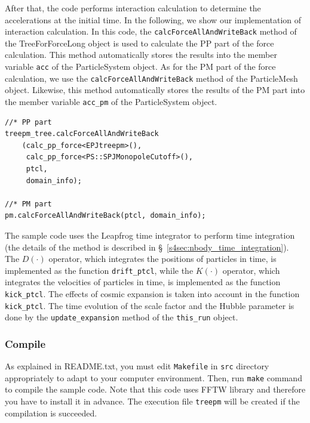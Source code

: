 After that, the code performs interaction calculation to determine the accelerations at the initial time.
In the following, we show our implementation of interaction calculation.
In this code, the \texttt{calcForceAllAndWriteBack} method of the \textsf{TreeForForceLong} object is used to calculate the PP part of the force calculation. This method automatically stores the results into the member variable \texttt{acc} of the \textsf{ParticleSystem} object. As for the PM part of the force calculation, we use the \texttt{calcForceAllAndWriteBack} method of the \textsf{ParticleMesh} object. Likewise, this method automatically stores the results of the PM part into the member variable \texttt{acc\_pm} of the \textsf{ParticleSystem} object.

\begin{lstlisting}[caption=Interaction Calculation]
//* PP part
treepm_tree.calcForceAllAndWriteBack
    (calc_pp_force<EPJtreepm>(),
     calc_pp_force<PS::SPJMonopoleCutoff>(),
     ptcl,
     domain_info);
 
//* PM part
pm.calcForceAllAndWriteBack(ptcl, domain_info); 
\end{lstlisting}

The sample code uses the Leapfrog time integrator to perform time integration (the details of the method is described in \S~\ref{s4sec:nbody_time_integration}). The $D(\cdot)$ operator, which integrates the positions of particles in time, is implemented as the function \texttt{drift\_ptcl}, while the $K(\cdot)$ operator, which integrates the velocities of particles in time, is implemented as the function \texttt{kick\_ptcl}. The effects of cosmic expansion is taken into account in the function \texttt{kick\_ptcl}. The time evolution of the scale factor and the Hubble parameter is done by the \texttt{update\_expansion} method of the \texttt{this\_run} object.

\subsubsection{Compile}
As explained in README.txt, you must edit \texttt{Makefile} in \texttt{src} directory appropriately to adapt to your computer environment. Then, run \texttt{make} command to compile the sample code. Note that this code uses FFTW library and therefore you have to install it in advance. The execution file \texttt{treepm} will be created if the compilation is succeeded.

